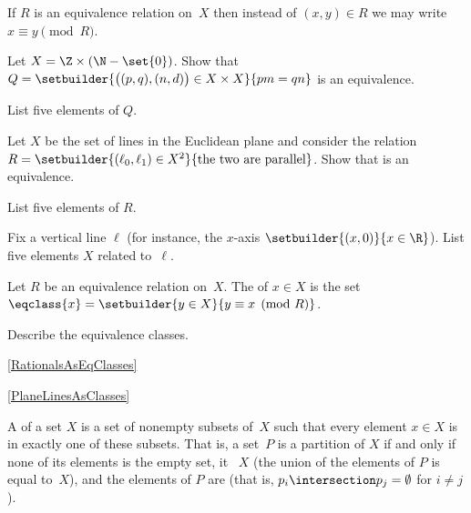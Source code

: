 \documentclass{ibl}
\begin{document}
\begin{df}
If $R$ is an equivalence relation on~$X$ then instead of $(x,y)\in R$
we may write $x\equiv y\pmod R$.  
\end{df}

\begin{ex} \label{RationalsAsEqClasses}
\begin{exes}
\item Let $X=\Z\times (\N-\set{0})$.
Show that 
$Q=\setbuilder{\big((p,q),(n,d)\big)\in X\times X}{pm=qn}$
is an equivalence.
\item List five elements of $Q$.
\end{exes}
\end{ex}

\begin{ex} \label{PlaneLinesAsClasses}
\begin{exes}
\item Let $X$ be the set of lines in the Euclidean plane and consider
the relation
$R=\setbuilder{(\ell_0,\ell_1)\in X^2}{\text{the two are parallel}}$. 
Show that is an equivalence.
\item List five elements of $R$.
\item Fix a vertical line $\ell$ (for instance, the $x$-axis 
  $\setbuilder{(x,0)}{x\in\R}$).
  List five elements $X$ related to~$\ell$.
\end{exes}
\end{ex}

\begin{df}
Let $R$ be an equivalence relation on~$X$.
The  of $x\in X$ is the set
$\eqclass{x}=\setbuilder{y\in X}{y\equiv x\pmod R}$.   
\end{df}

\begin{ex} Describe the equivalence classes.
\begin{exes}
\item \cref{RationalsAsEqClasses}
\item \cref{PlaneLinesAsClasses}
\end{exes}
\end{ex}

\begin{df}
A  of a set $X$ is a 
set of nonempty subsets of~$X$ such that every element $x\in X$ 
is in exactly one of these subsets.
That is, a set~$P$ is a partition of $X$ if and only if 
none of its elements is the empty set,
it ~$X$
(the union of the elements of $P$ is equal to~$X$),
and the elements of $P$ are 
(that is, $p_i\intersection p_j=\emptyset$ for $i\neq j$).
\end{df}
\end{document}
